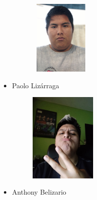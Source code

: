\documentclass[12pt]{article}
\begin{document}
\begin{multicols}{2}
\vspace{\baselineskip}



\begin{figure}[H]		\includegraphics[width=1.75in,height=1.44in]{./media/image1.png}
\end{figure}



\begin{itemize}
	\item {\fontsize{9pt}{10.8pt}\selectfont Paolo Lizárraga\par}\par


\end{itemize}
\vspace{\baselineskip}


\begin{figure}[H]		\includegraphics[width=1.84in,height=1.72in]{./media/image2.png}
\end{figure}



\begin{itemize}
	\item {\fontsize{9pt}{10.8pt}\selectfont Anthony Belizario\par}\par


\vspace{\baselineskip}


\end{itemize}
\end{multicols}
\end{document}
